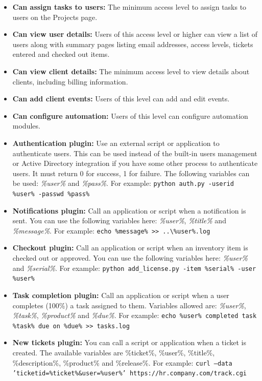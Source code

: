 \documentclass[11pt]{article}
\begin{document}
\begin{itemize}
\item \textbf{Can assign tasks to users:} The minimum access level to assign tasks to users on the Projects page.
\item \textbf{Can view user details:} Users of this access level or higher can view a list of users along with summary pages listing email addresses, access levels, tickets entered and checked out items.
\item \textbf{Can view client details:} The minimum access level to view details about clients, including billing information.
\item \textbf{Can add client events:} Users of this level can add and edit events.
\item \textbf{Can configure automation:} Users of this level can configure automation modules.
\item \textbf{Authentication plugin:} Use an external script or application to authenticate users. This can be used instead of the built-in users management or Active Directory integration if you have some other process to authenticate users. It must return 0 for success, 1 for failure. The following variables can be used: \textit{\%user\%} and \textit{\%pass\%}. For example: \texttt{python auth.py -userid \%user\% -passwd \%pass\%}
\item \textbf{Notifications plugin:} Call an application or script when a notification is sent. You can use the following variables here: \textit{\%user\%}, \textit{\%title\%} and \textit{\%message\%}. For example: \texttt{echo \%message\% >> ..\textbackslash \%user\%.log}
\item \textbf{Checkout plugin:} Call an application or script when an inventory item is checked out or approved. You can use the following variables here: \textit{\%user\%} and \textit{\%serial\%}. For example: \texttt{python add\_license.py -item \%serial\% -user \%user\%}
\item \textbf{Task completion plugin:} Call an application or script when a user completes (100\%) a task assigned to them. Variables allowed are: \textit{\%user\%}, \textit{\%task\%}, \textit{\%product\%} and \textit{\%due\%}. For example: \texttt{echo \%user\% completed task \%task\% due on \%due\% >> tasks.log}
\item \textbf{New tickets plugin:} You can call a script or application when a ticket is created. The available variables are \%ticket\%, \%user\%, \%title\%, \%description\%, \%product\% and \%release\%. For example: \texttt{curl --data 'ticketid=\%ticket\%\&user=\%user\%' https://hr.company.com/track.cgi}

\end{itemize}
\end{document}
